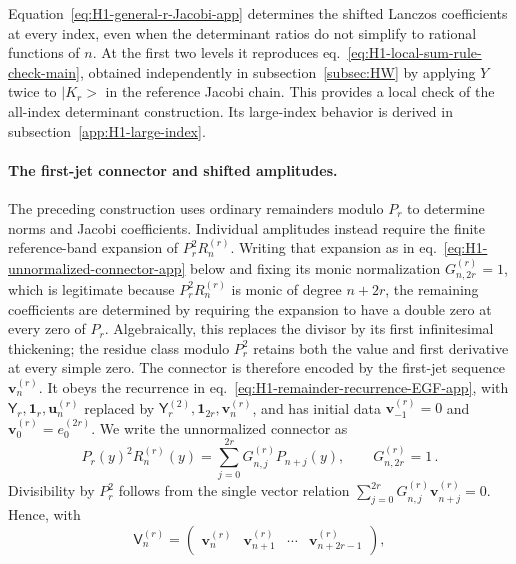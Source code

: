 \documentclass[a4paper,11pt]{article}
\def\ket#1{|#1>}%
\theoremstyle{definition}
\theoremstyle{remark}
\newcommand{\ket}[1]{|#1\rangle}
\newcommand{\Id}{\mathbf 1}
\begin{document}
Equation~\eqref{eq:H1-general-r-Jacobi-app}
determines the shifted Lanczos coefficients at every index, even when the
determinant ratios do not simplify to rational functions of
$n$. At the first two levels it reproduces
eq.~\eqref{eq:H1-local-sum-rule-check-main}, obtained independently in
subsection~\ref{subsec:HW} by applying $Y$ twice to $\ket{K_r}$ in the
reference Jacobi chain. This provides a local check of the all-index
determinant construction. Its large-index behavior is derived in
subsection~\ref{app:H1-large-index}.

\paragraph{The first-jet connector and shifted amplitudes.}
The preceding construction uses ordinary remainders modulo $P_r$ to determine norms and Jacobi coefficients. Individual amplitudes instead require the finite reference-band expansion of $P_r^2R_n^{(r)}$. Writing that expansion as in eq.~\eqref{eq:H1-unnormalized-connector-app} below and fixing its monic normalization $G_{n,2r}^{(r)}=1$, which is legitimate because $P_r^2R_n^{(r)}$ is monic of degree $n+2r$, the  remaining coefficients are determined by requiring the expansion to have a double zero at every zero of $P_r$. Algebraically, this replaces the divisor by its first infinitesimal thickening; the residue class modulo $P_r^2$ retains both the value and first derivative at every simple zero. The connector is therefore encoded by the first-jet sequence $\mathbf v_n^{(r)}$. It obeys the recurrence in eq.~\eqref{eq:H1-remainder-recurrence-EGF-app}, with $\mathsf Y_r,\Id_r,\mathbf u_n^{(r)}$ replaced by $\mathsf Y_r^{(2)},\Id_{2r},\mathbf v_n^{(r)}$, and has initial data $\mathbf v_{-1}^{(r)}=0$ and $\mathbf v_0^{(r)}=e_0^{(2r)}$. We write the unnormalized connector as
\begin{equation}
   P_r(y)^2R_n^{(r)}(y)
   =\sum_{j=0}^{2r}G_{n,j}^{(r)}P_{n+j}(y),
   \qquad G_{n,2r}^{(r)}=1\,.
   \label{eq:H1-unnormalized-connector-app}
\end{equation}
Divisibility by $P_r^2$ follows from the single vector relation $\sum_{j=0}^{2r}G_{n,j}^{(r)}\mathbf v_{n+j}^{(r)}=0$. Hence, with
\begin{equation}
   \mathsf V_n^{(r)}
   =\begin{pmatrix}
      \mathbf v_n^{(r)}&\mathbf v_{n+1}^{(r)}&\cdots&
      \mathbf v_{n+2r-1}^{(r)}
   \end{pmatrix},
   \label{eq:H1-jet-window-matrix-app}
\end{equation}
\end{document}
